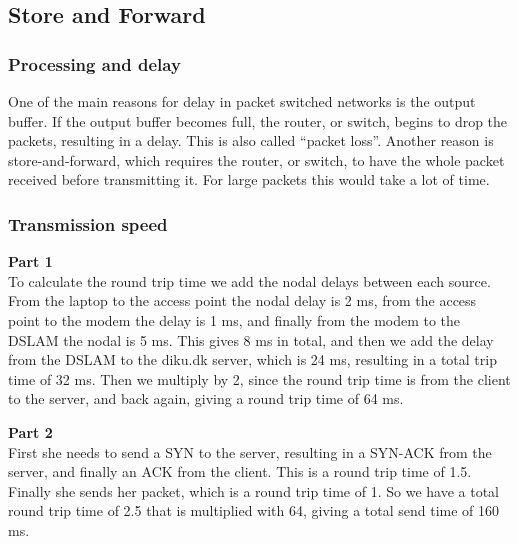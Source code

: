 \subsection{Store and Forward}
\subsubsection{Processing and delay}
One of the main reasons for delay in packet switched networks is the output
buffer. If the output buffer becomes full, the router, or switch, begins to drop
the packets, resulting in a delay. This is also called ``packet loss''. Another
reason is store-and-forward, which requires the router, or switch, to have the
whole packet received before transmitting it. For large packets this would take
a lot of time.

\subsubsection{Transmission speed}
\textbf{Part 1}\\
To calculate the round trip time we add the nodal delays between each source.
From the laptop to the access point the nodal delay is 2 ms, from the access
point to the modem the delay is 1 ms, and finally from the modem to the DSLAM
the nodal is 5 ms. This gives 8 ms in total, and then we add the delay from the
DSLAM to the diku.dk server, which is 24 ms, resulting in a total trip time of
32 ms. Then we multiply by 2, since the round trip time is from the client to
the server, and back again, giving a round trip time of 64 ms.

\noindent \textbf{Part 2}\\
First she needs to send a SYN to the server, resulting in a SYN-ACK from the
server, and finally an ACK from the client. This is a round trip time of 1.5.
Finally she sends her packet, which is a round trip time of 1. So we have a
total round trip time of 2.5 that is multiplied with 64, giving a total send
time of 160 ms.